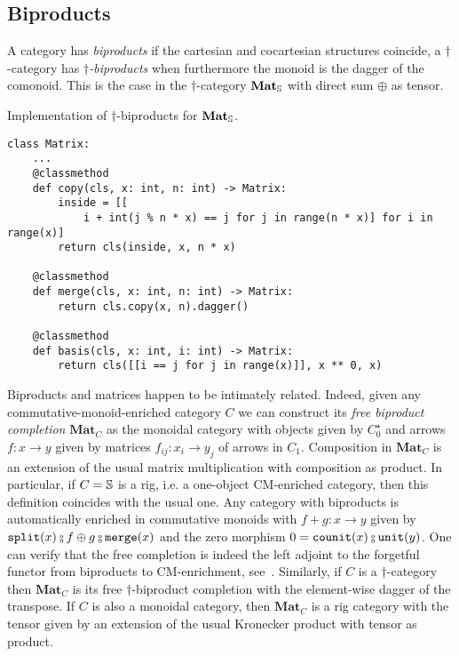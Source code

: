 \subsection{Biproducts}\label{subsection:biproducts}

A category has \emph{biproducts} if the cartesian and cocartesian structures coincide,
a $\dagger$-category has \emph{$\dagger$-biproducts} when furthermore the monoid is the dagger of the comonoid.
This is the case in the $\dagger$-category $\mathbf{Mat}_\S$ with direct sum $\oplus$ as tensor.

\begin{python}
{\normalfont Implementation of $\dagger$-biproducts for $\mathbf{Mat}_\S$.}

\begin{verbatim}
class Matrix:
    ...
    @classmethod
    def copy(cls, x: int, n: int) -> Matrix:
        inside = [[
            i + int(j % n * x) == j for j in range(n * x)] for i in range(x)]
        return cls(inside, x, n * x)

    @classmethod
    def merge(cls, x: int, n: int) -> Matrix:
        return cls.copy(x, n).dagger()

    @classmethod
    def basis(cls, x: int, i: int) -> Matrix:
        return cls([[i == j for j in range(x)]], x ** 0, x)
\end{verbatim}
\end{python}

Biproducts and matrices happen to be intimately related.
Indeed, given any commutative-monoid-enriched category $C$ we can construct its \emph{free biproduct completion} $\mathbf{Mat}_C$ as the monoidal category with objects given by $C_0^\star$ and arrows $f : x \to y$ given by matrices $f_{ij} : x_i \to y_j$ of arrows in $C_1$.
Composition in $\mathbf{Mat}_C$ is an extension of the usual matrix multiplication with composition as product.
In particular, if $C = \S$ is a rig, i.e. a one-object CM-enriched category, then this definition coincides with the usual one.
Any category with biproducts is automatically enriched in commutative monoids with $f + g : x \to y$ given by $\ttsplit(x) \fcmp f \oplus g \fcmp \merge(x)$ and the zero morphism $0 = \counit(x) \fcmp \unit(y)$.
One can verify that the free completion is indeed the left adjoint to the forgetful functor from biproducts to CM-enrichment, see~\cite[Exercise VIII.2.6]{MacLane71}.
Similarly, if $C$ is a $\dagger$-category then $\mathbf{Mat}_C$ is its free $\dagger$-biproduct completion with the element-wise dagger of the transpose.
If $C$ is also a monoidal category, then $\mathbf{Mat}_C$ is a rig category with the tensor given by an extension of the usual Kronecker product with tensor as product.

